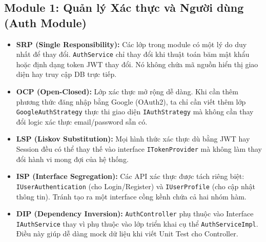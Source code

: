 \documentclass[12pt,a4paper]{article}
\begin{document}
\subsection{Module 1: Quản lý Xác thực và Người dùng (Auth Module)}
\begin{itemize}
    \item \textbf{SRP (Single Responsibility):} Các lớp trong module có một lý do duy nhất để thay đổi. \texttt{AuthService} chỉ thay đổi khi thuật toán băm mật khẩu hoặc định dạng token JWT thay đổi. Nó không chứa mã nguồn hiển thị giao diện hay truy cập DB trực tiếp.
    \item \textbf{OCP (Open-Closed):} Lớp xác thực mở rộng dễ dàng. Khi cần thêm phương thức đăng nhập bằng Google (OAuth2), ta chỉ cần viết thêm lớp \texttt{GoogleAuthStrategy} thực thi giao diện \texttt{IAuthStrategy} mà không cần thay đổi logic xác thực email/password sẵn có.
    \item \textbf{LSP (Liskov Substitution):} Mọi hình thức xác thực dù bằng JWT hay Session đều có thể thay thế vào interface \texttt{ITokenProvider} mà không làm thay đổi hành vi mong đợi của hệ thống.
    \item \textbf{ISP (Interface Segregation):} Các API xác thực được tách riêng biệt: \texttt{IUserAuthentication} (cho Login/Register) và \texttt{IUserProfile} (cho cập nhật thông tin). Tránh tạo ra một interface cồng kềnh chứa cả hai nhóm hàm.
    \item \textbf{DIP (Dependency Inversion):} \texttt{AuthController} phụ thuộc vào Interface \texttt{IAuthService} thay vì phụ thuộc vào lớp triển khai cụ thể \texttt{AuthServiceImpl}. Điều này giúp dễ dàng mock dữ liệu khi viết Unit Test cho Controller.
\end{itemize}
\end{document}
